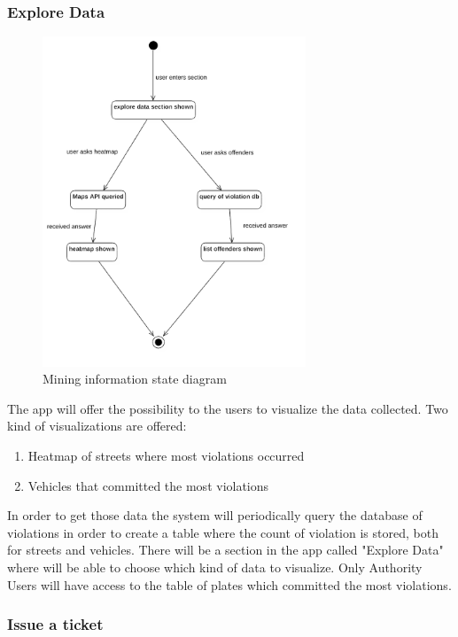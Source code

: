 \subsubsection{Explore Data}
\begin{figure}
\centering
\includegraphics[width=0.7\textwidth]{Images/minestate.png}
\caption{\label{fig:minestatediag} Mining information state diagram}
\end{figure}


The app will offer the possibility to the users to visualize the data collected.
Two kind of visualizations are offered:
\begin{enumerate}
  \item Heatmap of streets where most violations occurred
  \item Vehicles that committed the most violations \label{blacklistplates}
\end{enumerate}
In order to get those data the system will periodically query the database of violations in order to create a table where the count of violation is stored, both for streets and vehicles.
There will be a section in the app called "Explore Data" where will be able to choose which kind of data to visualize.
Only Authority Users will have access to the table of plates which committed the most violations.

\subsubsection{Issue a ticket}

